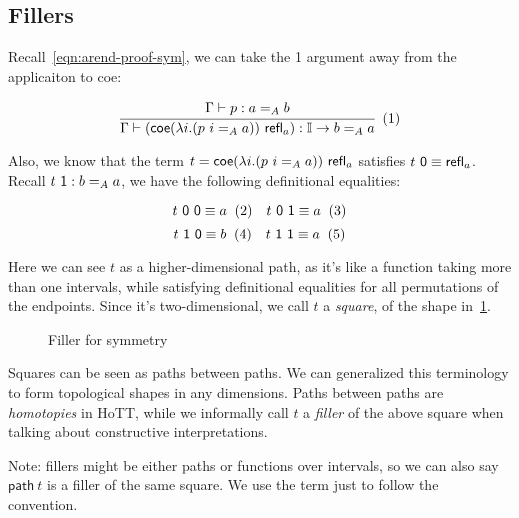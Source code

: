 

\subsection{Fillers}
\label{subsec:fill}

Recall~\ref{eqn:arend-proof-sym}, we can take the \textsf 1 argument away from
the applicaiton to \textsf{coe}:

\[
  \cfrac{
    \Gamma \vdash p : a =_A b
  }{
    \Gamma \vdash (\textsf{coe}
    (\lambda i. (p\ i =_A a)) \ \refl_a)
    : \mathbb I \rightarrow b =_A a
  }
  \xtag \label{eqn:coe-a-b-path-gen-eta}
\]

Also, we know that the term $t = \textsf{coe} (\lambda i. (p\ i =_A a)) \ \textsf{refl}_a$
satisfies $t\ \textsf 0 \equiv \textsf{refl}_a$.
Recall $t\ \textsf 1 : b =_A a$,
we have the following definitional equalities:

\[
  t\ \textsf 0\ \textsf 0 \equiv a \xtag \quad
  t\ \textsf 0\ \textsf 1 \equiv a \xtag
\]
\[
  t\ \textsf 1\ \textsf 0 \equiv b \xtag \quad
  t\ \textsf 1\ \textsf 1 \equiv a \xtag
\]

Here we can see $t$ as a higher-dimensional path,
as it's like a function taking more than one intervals,
while satisfying definitional equalities for all permutations of the endpoints.
Since it's two-dimensional, we call $t$ a \textit{square},
of the shape in~\cref{fig:filler}.

\begin{figure}
\begin{center}
\end{center}
\caption{Filler for symmetry}
\label{fig:filler}
\end{figure}

Squares can be seen as paths between paths.
We can generalized this terminology to form topological shapes in any dimensions.
Paths between paths are \textit{homotopies} in HoTT,
while we informally call $t$ a \textit{filler} of the above square
when talking about constructive interpretations.

Note: fillers might be either paths or functions over intervals,
so we can also say $\textsf{path} \ t$ is a filler of the same square.
We use the term just to follow the convention.

